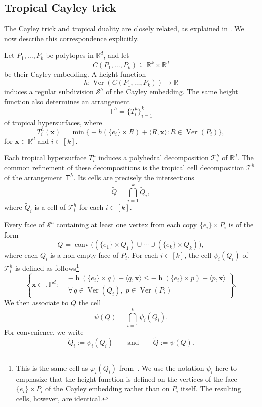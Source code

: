 \documentclass[12pt, reqno]{amsart}
\newcommand{\h}{\operatorname{h}}
\theoremstyle{plain}
\theoremstyle{definition}
\numberwithin{equation}{section}
\begin{document}
\subsection{Tropical Cayley trick}

The Cayley trick and tropical duality are closely related, as explained in \cite{santos2005cayley,Joswig2017,joswig_essentials_tropical_2021,d2023realizing}. We now describe this correspondence explicitly.

Let $P_1,\ldots,P_k$ be polytopes in $\mathbb{R}^d$, and let
\[
C(P_1,\ldots,P_k)\subseteq \mathbb{R}^k\times\mathbb{R}^d
\]
be their Cayley embedding. A height function
\[
h:\operatorname{Ver}(C(P_1,\ldots,P_k))\longrightarrow\mathbb{R}
\]
induces a regular subdivision $\mathcal{S}^h$ of the Cayley embedding. The same height function also determines an arrangement
\[
\mathsf{T}^h=\{T_i^h\}_{i=1}^k
\]
of tropical hypersurfaces, where
\[
T_i^h(\mathbf{x})
=
\min\bigl\{-h(\{e_i\}\times R)+\langle R,\mathbf{x}\rangle :
R\in\operatorname{Ver}(P_i)\bigr\},
\]
for $\mathbf{x}\in\mathbb{R}^d$ and $i\in[k]$.

Each tropical hypersurface $T_i^h$ induces a polyhedral decomposition $\mathcal{T}_i^h$ of $\mathbb{R}^d$. The common refinement of these decompositions is the tropical cell decomposition $\mathscr{T}^h$ of the arrangement $\mathsf{T}^h$. Its cells are precisely the intersections
\[
\tilde Q=\bigcap_{i=1}^k \tilde Q_i,
\]
where $\tilde Q_i$ is a cell of $\mathcal{T}_i^h$ for each $i\in[k]$.

Every face of $\mathcal{S}^h$ containing at least one vertex from each copy $\{e_i\}\times P_i$ is of the form
\[
Q=
\operatorname{conv}\bigl((\{e_1\}\times Q_1)\cup\cdots\cup(\{e_k\}\times Q_k)\bigr),
\]
where each $Q_i$ is a non-empty face of $P_i$. For each $i\in[k]$, the cell $\psi_i(Q_i)$ of $\mathcal{T}_i^h$ is defined as follows\footnote{This is the same cell as $\varphi_i(Q_i)$ from~. We use the notation $\psi_i$ here to emphasize that the height function is defined on the vertices of the face $\{e_i\}\times P_i$ of the Cayley embedding rather than on $P_i$ itself. The resulting cells, however, are identical.}
\[
\left\{
\mathbf{x}\in\mathbb{TP}^d:
\begin{aligned}
&-\h(\{e_i\}\times q)+\langle q,\mathbf{x}\rangle
\le
-\h(\{e_i\}\times p)+\langle p,\mathbf{x}\rangle \\
&\forall\, q\in\operatorname{Ver}(Q_i),\;
p\in\operatorname{Ver}(P_i)
\end{aligned}
\right\}.
\]
We then associate to $Q$ the cell
\[
\psi(Q)=
\bigcap_{i=1}^k \psi_i(Q_i).
\]
For convenience, we write
\[
\tilde Q_i:=\psi_i(Q_i)
\qquad\text{and}\qquad
\tilde Q:=\psi(Q).
\]
\end{document}
